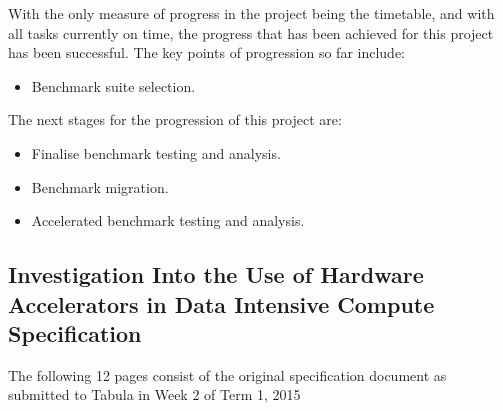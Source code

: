 \documentclass[12pt,a4paper]{article}
\begin{document}
        With the only measure of progress in the project being the timetable, and with all tasks currently on time, the progress that has been achieved for this project has been successful. The key points of progression so far include:

        \begin{itemize}
            \item Benchmark suite selection.
        \end{itemize}

        The next stages for the progression of this project are:

        \begin{itemize}
            \item Finalise benchmark testing and analysis.
            \item Benchmark migration.
            \item Accelerated benchmark testing and analysis.
        \end{itemize}

	\printbibliography
	
    \clearpage
	\begin{appendices}
	    \section{Investigation Into the Use of Hardware Accelerators in Data Intensive Compute Specification}
	    The following 12 pages consist of the original specification document as submitted to Tabula in Week 2 of Term 1, 2015
	    \label{app:specification}
	    
	        
	\end{appendices}
\end{document}
